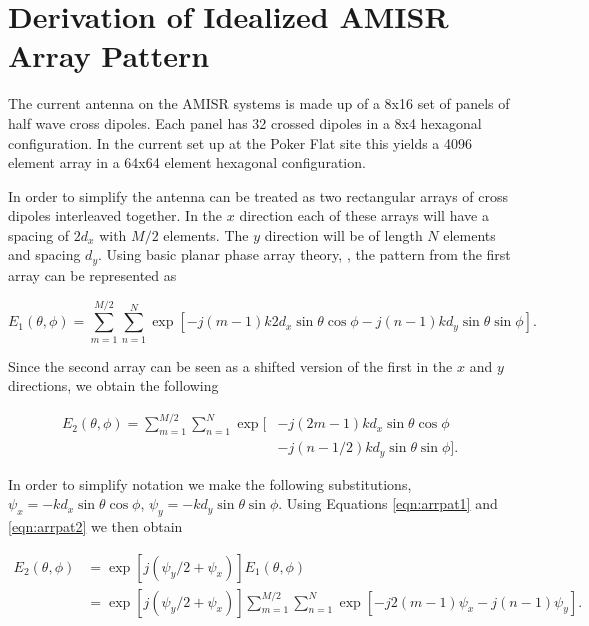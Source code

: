 \chapter{Derivation of Idealized AMISR Array Pattern}
 \label{App:AMISRarr}
\thispagestyle{myheadings}
\graphicspath{{Appendix/Figures/}}

The current antenna on the AMISR systems is made up of a 8x16 set of panels of half wave cross dipoles. Each panel has 32 crossed dipoles in a 8x4 hexagonal configuration. In the current set up at the Poker Flat site this yields a 4096 element array in a 64x64 element hexagonal configuration.

In order to simplify the antenna can be treated as two rectangular arrays of cross dipoles interleaved together. In the $x$ direction each of these arrays will have a spacing of $2d_x$ with $M/2$ elements. The $y$ direction will be of length $N$ elements and spacing $d_y$. Using basic planar phase array theory, \citep{Balanis:2005:ATA:1208379}, the pattern from the first array can be represented as 

\begin{equation}
\label{eqn:arrpat1}
E_1(\theta,\phi) =\displaystyle \sum_{m=1}^{M/2}\sum_{n=1}^{N} \exp\left[-j\left(m-1\right)k2d_x\sin\theta\cos\phi -j\left(n-1\right) k d_y\sin\theta\sin\phi\right].
\end{equation}

\noindent Since the second array can be seen as a shifted version of the first in the $x$ and $y$ directions, we obtain the following

\begin{equation}
\label{eqn:arrpat2}
\begin{split}
E_2(\theta,\phi) =\displaystyle \sum_{m=1}^{M/2}\sum_{n=1}^{N} \exp[&-j\left(2m-1\right)kd_x\sin\theta\cos\phi \\ &-j\left(n-1/2\right) k d_y\sin\theta\sin\phi].
\end{split}
\end{equation}

In order to simplify notation we make the following substitutions, $\psi_x = -k d_x\sin\theta\cos\phi$, $\psi_y = -k d_y\sin\theta\sin\phi$. Using Equations \ref{eqn:arrpat1} and \ref{eqn:arrpat2} we then obtain

\begin{equation}
\label{eqn:arrpateqn}
\begin{split}
E_2(\theta,\phi)  &=  \exp\left[j(\psi_y/2 + \psi_x)\right] E_1(\theta,\phi)  \\&= \exp\left[j(\psi_y/2 + \psi_x)\right]  \displaystyle \sum_{m=1}^{M/2}\sum_{n=1}^{N}  \exp\left[-j2\left(m-1\right) \psi_x -j\left(n-1\right) \psi_y\right].
\end{split}
\end{equation}

